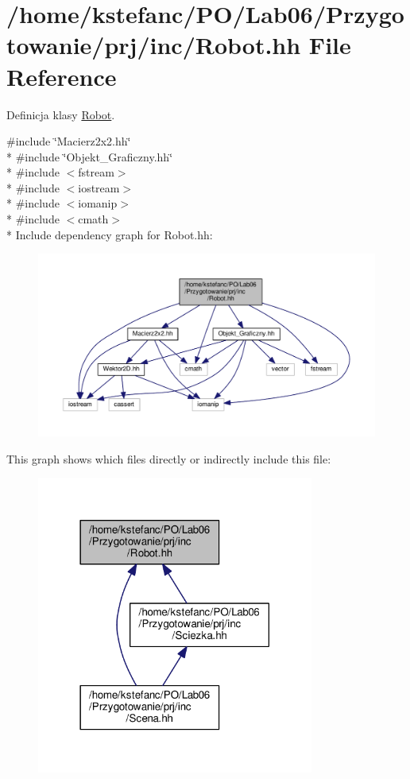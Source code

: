 \hypertarget{_robot_8hh}{\section{/home/kstefanc/\+P\+O/\+Lab06/\+Przygotowanie/prj/inc/\+Robot.hh File Reference}
\label{_robot_8hh}
}


Definicja klasy \hyperlink{class_robot}{Robot}.  


{\ttfamily \#include \char`\"{}Macierz2x2.\+hh\char`\"{}}\\*
{\ttfamily \#include \char`\"{}Objekt\+\_\+\+Graficzny.\+hh\char`\"{}}\\*
{\ttfamily \#include $<$fstream$>$}\\*
{\ttfamily \#include $<$iostream$>$}\\*
{\ttfamily \#include $<$iomanip$>$}\\*
{\ttfamily \#include $<$cmath$>$}\\*
Include dependency graph for Robot.\+hh\+:
\nopagebreak
\begin{figure}[H]
\begin{center}
\leavevmode
\includegraphics[width=350pt]{_robot_8hh__incl}
\end{center}
\end{figure}
This graph shows which files directly or indirectly include this file\+:
\nopagebreak
\begin{figure}[H]
\begin{center}
\leavevmode
\includegraphics[width=258pt]{_robot_8hh__dep__incl}
\end{center}
\end{figure}
